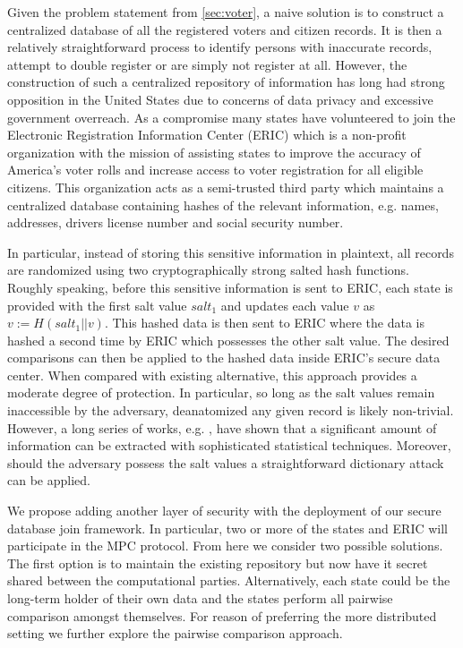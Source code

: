 \documentclass[11pt,letterpaper]{article}
\providecommand{\DIFaddend}{} %
\begin{document}
\DIFaddend Given the problem statement from \ref{sec:voter}, a naive solution is to construct a centralized database of all the registered voters and citizen records. It is then a relatively straightforward process to identify persons with inaccurate records, attempt to double register or are simply not register at all. However, the construction of such a centralized repository of information has long had strong opposition in the United States due to concerns of data privacy and  excessive government overreach. As a compromise many states have volunteered to join the Electronic Registration Information Center (ERIC)\cite{eric} which is a non-profit organization with the mission of assisting states to improve the accuracy of America’s voter rolls and increase access to voter registration for all eligible citizens. This organization acts as a semi-trusted third party which maintains a centralized database containing hashes of the relevant information, e.g. names, addresses, drivers license number and social security number. 
\fi

In particular, instead of storing this sensitive information in plaintext, all records are randomized using two cryptographically strong salted hash functions. Roughly speaking, before this sensitive information is sent to ERIC, each state is provided with the first salt value $salt_1$ and updates each value $v$ as $v := H(salt_1 || v)$. This hashed data is then sent to ERIC where the data is hashed a second time by ERIC which possesses the other salt value. The desired comparisons can then be applied to the hashed data inside ERIC's secure data center. When compared with existing alternative, this approach provides a moderate degree of protection. In particular, so long as the salt values remain inaccessible by the adversary, deanatomized any given record is likely non-trivial. However, a long series of works, e.g. \cite{deanon0,deanon1,deanon2,deanon3,deanon4}, have shown that a significant amount of information can be extracted with sophisticated statistical techniques. Moreover, should the adversary possess the salt values a straightforward dictionary attack can be applied.

We propose adding another layer of security with the deployment of our secure database join framework. In particular, two or more of the states and ERIC will participate in the MPC protocol. From here we consider two possible solutions. The first option is to maintain the existing repository but now have it secret shared between the computational parties. Alternatively, each state could be the long-term holder of their own data and the states perform all pairwise comparison amongst themselves. For reason of preferring the more distributed setting we further explore the pairwise comparison approach. 
\end{document}
